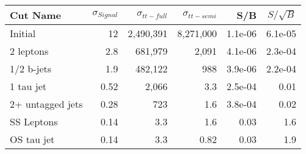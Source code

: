 \begin{tabular}{lrrrrr}
\toprule
         Cut Name &  $\sigma_{Signal}$ &  $\sigma_{tt-full}$ &  $\sigma_{tt-semi}$ &     S/B &  $S/\sqrt{B}$ \\
\midrule
          Initial &                 12 &           2,490,391 &           8,271,000 & 1.1e-06 &       6.1e-05 \\
        2 leptons &                2.8 &             681,979 &               2,091 & 4.1e-06 &       2.3e-04 \\
       1/2 b-jets &                1.9 &             482,122 &                 988 & 3.9e-06 &       2.2e-04 \\
        1 tau jet &               0.52 &               2,066 &                 3.3 & 2.5e-04 &          0.01 \\
 2+ untagged jets &               0.28 &                 723 &                 1.6 & 3.8e-04 &          0.02 \\
       SS Leptons &               0.14 &                 3.3 &                 1.6 &    0.03 &           1.6 \\
       OS tau jet &               0.14 &                 3.3 &                0.82 &    0.03 &           1.9 \\
\bottomrule
\end{tabular}
